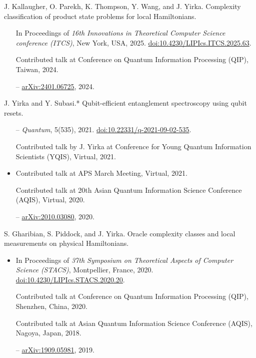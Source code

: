 \documentclass[11pt,letterpaper,serif]{moderncv}
\begin{document}
J. Kallaugher, O. Parekh, K. Thompson, Y. Wang, and J. Yirka.\quad
Complexity classification of product state problems for local Hamiltonians.
\begin{adjustwidth}{.25in}{}
	\begin{itemize}
		\item[\textbullet] In Proceedings of \textit{16th Innovations in Theoretical Computer Science conference (ITCS)}, New York, USA, 2025.\quad
		\href{https://doi.org/10.4230/LIPIcs.ITCS.2025.63}{doi:10.4230/LIPIcs.ITCS.2025.63}.
		\item[\textbullet] Contributed talk at Conference on Quantum Information Processing (QIP), Taiwan, 2024.
		\item[--] \href{https://arxiv.org/abs/2401.06725}{arXiv:2401.06725}, 2024.
	\end{itemize}
\end{adjustwidth}
\medskip

J. Yirka and Y. Subasi.*\quad
Qubit-efficient entanglement spectroscopy using qubit resets.
\begin{adjustwidth}{.25in}{}
	\begin{itemize}
		\item[--] \textit{Quantum}, 5(535), 2021.\quad
		\href{https://doi.org/10.22331/q-2021-09-02-535}{doi:10.22331/q-2021-09-02-535}.
		\item[\textbullet] Contributed talk by J. Yirka at Conference for Young Quantum Information Scientists (YQIS), Virtual, 2021.
		\item Contributed talk at APS March Meeting, Virtual, 2021.
		\item[\textbullet] Contributed talk at 20th Asian Quantum Information Science Conference (AQIS), Virtual, 2020.
		\item[--] \href{https://arxiv.org/abs/2010.03080}{arXiv:2010.03080}, 2020.
	\end{itemize}
\end{adjustwidth}
\medskip

S. Gharibian, S. Piddock, and J. Yirka.\quad
Oracle complexity classes and local measurements on physical Hamiltonians.
\begin{adjustwidth}{.25in}{}
	\begin{itemize}
		\item In Proceedings of \textit{37th Symposium on Theoretical Aspects of Computer Science (STACS)}, Montpellier, France, 2020.\quad
		\href{https://doi.org/10.4230/LIPIcs.STACS.2020.20}{doi:10.4230/LIPIcs.STACS.2020.20}.
		\item[\textbullet] Contributed talk at Conference on Quantum Information Processing (QIP), Shenzhen, China, 2020.
		\item[\textbullet] Contributed talk at Asian Quantum Information Science Conference (AQIS), Nagoya, Japan, 2018.
		\item[--]  \href{https://arxiv.org/abs/1909.05981}{arXiv:1909.05981}, 2019.
	\end{itemize}
\end{adjustwidth}
\medskip
\end{document}
